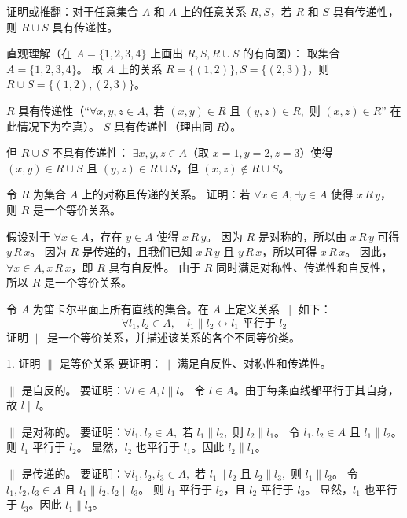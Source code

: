 \begin{questions}
\question 
证明或推翻：对于任意集合 $A$ 和 $A$ 上的任意关系 $R, S$，若 $R$ 和 $S$ 具有传递性，则 $R \cup S$ 具有传递性。

\begin{solution}
直观理解（在 $A = \{1, 2, 3, 4\}$ 上画出 $R, S, R \cup S$ 的有向图）：
取集合 $A = \{1, 2, 3, 4\}$。
取 $A$ 上的关系 $R = \{(1, 2)\}, S = \{(2, 3)\}$，则 $R \cup S = \{(1, 2), (2, 3)\}$。

$R$ 具有传递性（“$\forall x, y, z \in A,$ 若 $(x, y) \in R$ 且 $(y, z) \in R,$ 则 $(x, z) \in R$” 在此情况下为空真）。
$S$ 具有传递性（理由同 $R$）。

但 $R \cup S$ 不具有传递性：
$\exists x, y, z \in A$（取 $x = 1, y = 2, z = 3$）使得 $(x, y) \in R \cup S$ 且 $(y, z) \in R \cup S$，但 $(x, z) \notin R \cup S$。
\end{solution}

\question 
令 $R$ 为集合 $A$ 上的对称且传递的关系。
证明：若 $\forall x \in A, \exists y \in A \text{ 使得 } x \, R \, y$，则 $R$ 是一个等价关系。

\begin{solution}
假设对于 $\forall x \in A$，存在 $y \in A$ 使得 $x \, R \, y$。
因为 $R$ 是对称的，所以由 $x \, R \, y$ 可得 $y \, R \, x$。
因为 $R$ 是传递的，且我们已知 $x \, R \, y$ 且 $y \, R \, x$，所以可得 $x \, R \, x$。
因此，$\forall x \in A, x \, R \, x$，即 $R$ 具有自反性。
由于 $R$ 同时满足对称性、传递性和自反性，所以 $R$ 是一个等价关系。
\end{solution}

\question 
令 $A$ 为笛卡尔平面上所有直线的集合。在 $A$ 上定义关系 $\parallel$ 如下：
\[ \forall l_1, l_2 \in A, \quad l_1 \parallel l_2 \leftrightarrow l_1 \text{ 平行于 } l_2 \]
证明 $\parallel$ 是一个等价关系，并描述该关系的各个不同等价类。

\begin{solution}
 1. 证明 $\parallel$ 是等价关系
要证明：$\parallel$ 满足自反性、对称性和传递性。

$\parallel$ 是自反的。
要证明：$\forall l \in A, l \parallel l$。
令 $l \in A$。由于每条直线都平行于其自身，故 $l \parallel l$。

$\parallel$ 是对称的。
要证明：$\forall l_1, l_2 \in A,$ 若 $l_1 \parallel l_2,$ 则 $l_2 \parallel l_1$。
令 $l_1, l_2 \in A$ 且 $l_1 \parallel l_2$。则 $l_1$ 平行于 $l_2$。
显然，$l_2$ 也平行于 $l_1$。因此 $l_2 \parallel l_1$。

$\parallel$ 是传递的。
要证明：$\forall l_1, l_2, l_3 \in A,$ 若 $l_1 \parallel l_2$ 且 $l_2 \parallel l_3,$ 则 $l_1 \parallel l_3$。
令 $l_1, l_2, l_3 \in A$ 且 $l_1 \parallel l_2, l_2 \parallel l_3$。
则 $l_1$ 平行于 $l_2$，且 $l_2$ 平行于 $l_3$。
显然，$l_1$ 也平行于 $l_3$。因此 $l_1 \parallel l_3$。


\end{solution}
\end{questions}
